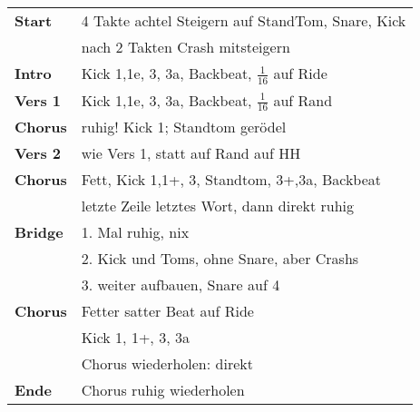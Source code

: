 
\begin{tabular}{p{1.6cm}l}
	\textbf{Start}  & 4 Takte achtel Steigern auf StandTom, Snare, Kick   \\
	                & nach 2 Takten Crash mitsteigern                     \\
	\textbf{Intro}  & Kick 1,1e, 3, 3a, Backbeat, $\frac{1}{16}$ auf Ride \\
	\textbf{Vers 1} & Kick 1,1e, 3, 3a, Backbeat, $\frac{1}{16}$ auf Rand \\
	\textbf{Chorus} & ruhig! Kick 1; Standtom gerödel                     \\
	\textbf{Vers 2} & wie Vers 1, statt auf Rand auf HH                   \\
	\textbf{Chorus} & Fett, Kick 1,1+, 3, Standtom, 3+,3a, Backbeat       \\
	                & letzte Zeile letztes Wort, dann direkt ruhig        \\
	\textbf{Bridge} & 1. Mal ruhig, nix                                   \\
	                & 2. Kick und Toms, ohne Snare, aber Crashs           \\
	                & 3. weiter aufbauen, Snare auf 4                     \\
	\textbf{Chorus} & Fetter satter Beat auf Ride                         \\
	                & Kick 1, 1+, 3, 3a                                   \\
	                & Chorus wiederholen: direkt                          \\
	\textbf{Ende}   & Chorus ruhig wiederholen                            \\
\end{tabular}
